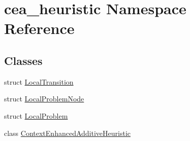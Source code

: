 \hypertarget{namespacecea__heuristic}{\section{cea\-\_\-heuristic Namespace Reference}
\label{namespacecea__heuristic}
}
\subsection*{Classes}
\begin{DoxyCompactItemize}
\item 
struct \hyperlink{structcea__heuristic_1_1LocalTransition}{Local\-Transition}
\item 
struct \hyperlink{structcea__heuristic_1_1LocalProblemNode}{Local\-Problem\-Node}
\item 
struct \hyperlink{structcea__heuristic_1_1LocalProblem}{Local\-Problem}
\item 
class \hyperlink{classcea__heuristic_1_1ContextEnhancedAdditiveHeuristic}{Context\-Enhanced\-Additive\-Heuristic}
\end{DoxyCompactItemize}
